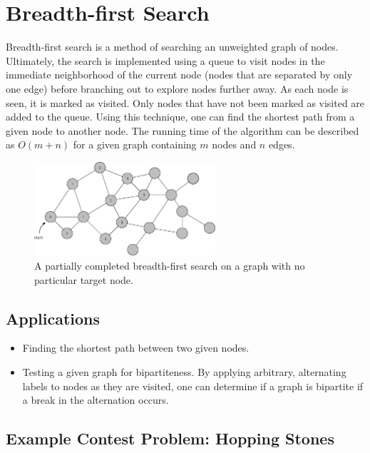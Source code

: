 \section{Breadth-first Search}

Breadth-first search is a method of searching an unweighted graph of nodes.
Ultimately, the search is implemented using a queue to visit nodes in the immediate neighborhood of the current node (nodes that are separated by only one edge) before branching out to explore nodes further away.
As each node is seen, it is marked as visited.
Only nodes that have not been marked as visited are added to the queue.
Using this technique, one can find the shortest path from a given node to another node.
The running time of the algorithm can be described as $O(m + n)$ for a given graph containing $m$ nodes and $n$ edges.

\begin{figure}[h]
	\centering
	\includegraphics[width=0.6\textwidth]{./algorithms/breadth-first-search/partial-bfs}
	\caption{\small A partially completed breadth-first search on a graph with no particular target node.}
\end{figure}

\subsection{Applications}

\begin{itemize}
	\item Finding the shortest path between two given nodes.
	\item Testing a given graph for bipartiteness.
	By applying arbitrary, alternating labels to nodes as they are visited, one can determine if a graph is bipartite if a break in the alternation occurs.
\end{itemize}

\subsection{Example Contest Problem: Hopping Stones}

